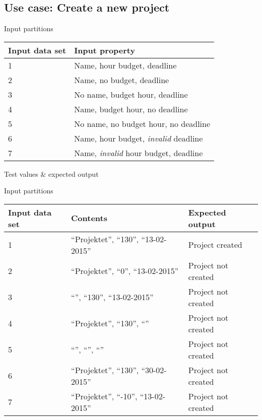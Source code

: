 \subsection{Use case: Create a new project}

Input partitions
\begin{center}
  \begin{tabular}{| l | l |}
    \hline
	Input data set & Input property \\ \hline
     1  & Name, hour budget, deadline \\ \hline
     2  & Name, no budget, deadline \\ \hline
     3  & No name, budget hour, deadline \\ \hline
     4  & Name, budget hour, no deadline \\ \hline
     5  & No name, no budget hour, no deadline \\ \hline
     6  & Name, hour budget, \emph{invalid} deadline \\ \hline
     7  & Name, \emph{invalid} hour budget, deadline \\ \hline
  \end{tabular}
\end{center}

Test values \& expected output

Input partitions
\begin{center}
  \begin{tabular}{| l | l | l |}
    \hline
	Input data set & Contents & Expected output \\ \hline
     1  & ``Projektet'', ``130'', ``13-02-2015'' & Project created  \\ \hline
     2  & ``Projektet'', ``0'', ``13-02-2015'' & Project not created  \\ \hline
     3  & ``'', ``130'', ``13-02-2015'' & Project not created  \\ \hline
     4  & ``Projektet'', ``130'', ``'' & Project not created  \\ \hline
     5  & ``'', ``'', ``'' & Project not created  \\ \hline
     6  & ``Projektet'', ``130'', ``30-02-2015'' & Project not created  \\ \hline
     7  & ``Projektet'', ``-10'', ``13-02-2015'' & Project not created  \\ \hline
  \end{tabular}
\end{center}